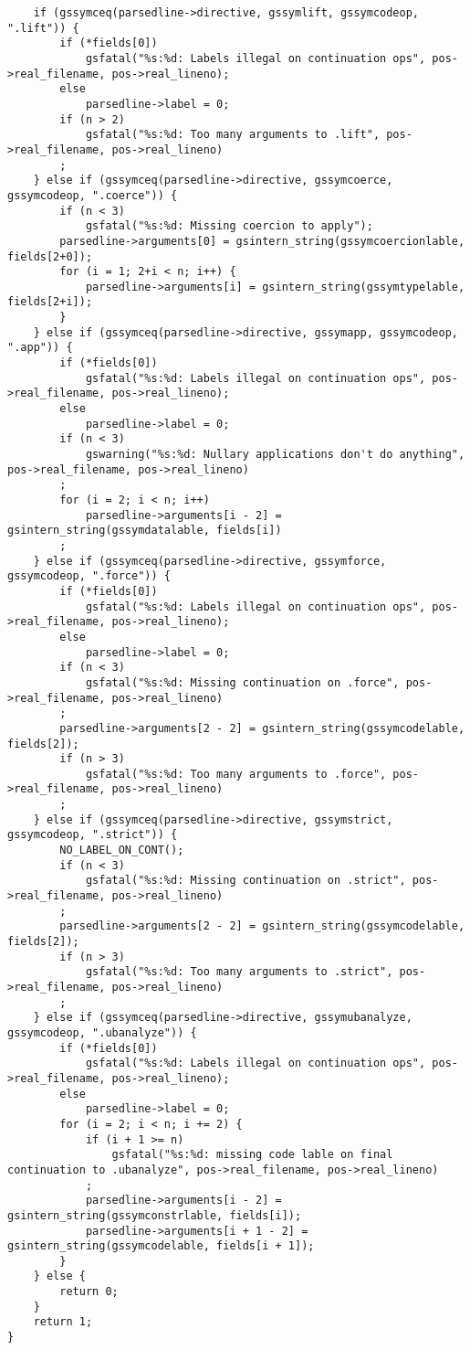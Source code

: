 \documentclass{report}
\begin{document}
\begin{verbatim}
    if (gssymceq(parsedline->directive, gssymlift, gssymcodeop, ".lift")) {
        if (*fields[0])
            gsfatal("%s:%d: Labels illegal on continuation ops", pos->real_filename, pos->real_lineno);
        else
            parsedline->label = 0;
        if (n > 2)
            gsfatal("%s:%d: Too many arguments to .lift", pos->real_filename, pos->real_lineno)
        ;
    } else if (gssymceq(parsedline->directive, gssymcoerce, gssymcodeop, ".coerce")) {
        if (n < 3)
            gsfatal("%s:%d: Missing coercion to apply");
        parsedline->arguments[0] = gsintern_string(gssymcoercionlable, fields[2+0]);
        for (i = 1; 2+i < n; i++) {
            parsedline->arguments[i] = gsintern_string(gssymtypelable, fields[2+i]);
        }
    } else if (gssymceq(parsedline->directive, gssymapp, gssymcodeop, ".app")) {
        if (*fields[0])
            gsfatal("%s:%d: Labels illegal on continuation ops", pos->real_filename, pos->real_lineno);
        else
            parsedline->label = 0;
        if (n < 3)
            gswarning("%s:%d: Nullary applications don't do anything", pos->real_filename, pos->real_lineno)
        ;
        for (i = 2; i < n; i++)
            parsedline->arguments[i - 2] = gsintern_string(gssymdatalable, fields[i])
        ;
    } else if (gssymceq(parsedline->directive, gssymforce, gssymcodeop, ".force")) {
        if (*fields[0])
            gsfatal("%s:%d: Labels illegal on continuation ops", pos->real_filename, pos->real_lineno);
        else
            parsedline->label = 0;
        if (n < 3)
            gsfatal("%s:%d: Missing continuation on .force", pos->real_filename, pos->real_lineno)
        ;
        parsedline->arguments[2 - 2] = gsintern_string(gssymcodelable, fields[2]);
        if (n > 3)
            gsfatal("%s:%d: Too many arguments to .force", pos->real_filename, pos->real_lineno)
        ;
    } else if (gssymceq(parsedline->directive, gssymstrict, gssymcodeop, ".strict")) {
        NO_LABEL_ON_CONT();
        if (n < 3)
            gsfatal("%s:%d: Missing continuation on .strict", pos->real_filename, pos->real_lineno)
        ;
        parsedline->arguments[2 - 2] = gsintern_string(gssymcodelable, fields[2]);
        if (n > 3)
            gsfatal("%s:%d: Too many arguments to .strict", pos->real_filename, pos->real_lineno)
        ;
    } else if (gssymceq(parsedline->directive, gssymubanalyze, gssymcodeop, ".ubanalyze")) {
        if (*fields[0])
            gsfatal("%s:%d: Labels illegal on continuation ops", pos->real_filename, pos->real_lineno);
        else
            parsedline->label = 0;
        for (i = 2; i < n; i += 2) {
            if (i + 1 >= n)
                gsfatal("%s:%d: missing code lable on final continuation to .ubanalyze", pos->real_filename, pos->real_lineno)
            ;
            parsedline->arguments[i - 2] = gsintern_string(gssymconstrlable, fields[i]);
            parsedline->arguments[i + 1 - 2] = gsintern_string(gssymcodelable, fields[i + 1]);
        }
    } else {
        return 0;
    }
    return 1;
}


\end{verbatim}
\end{document}

